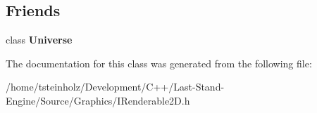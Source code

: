 \subsection*{Friends}
\begin{DoxyCompactItemize}
\item 
\hypertarget{classIRenderable2D_ac4da8dd404a2eaf5a0bd84aeb8de1197}{}class {\bfseries Universe}\label{classIRenderable2D_ac4da8dd404a2eaf5a0bd84aeb8de1197}

\end{DoxyCompactItemize}


The documentation for this class was generated from the following file\+:\begin{DoxyCompactItemize}
\item 
/home/tsteinholz/\+Development/\+C++/\+Last-\/\+Stand-\/\+Engine/\+Source/\+Graphics/I\+Renderable2\+D.\+h\end{DoxyCompactItemize}
